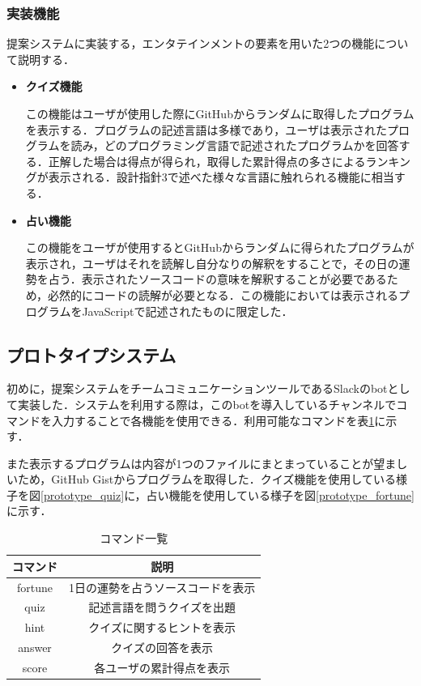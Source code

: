 \subsubsection{実装機能}
提案システムに実装する，エンタテインメントの要素を用いた2つの機能について説明する．
\begin{itemize}
  \item {\bf クイズ機能}

  この機能はユーザが使用した際にGitHubからランダムに取得したプログラムを表示する．プログラムの記述言語は多様であり，ユーザは表示されたプログラムを読み，どのプログラミング言語で記述されたプログラムかを回答する．正解した場合は得点が得られ，取得した累計得点の多さによるランキングが表示される．設計指針3で述べた様々な言語に触れられる機能に相当する．

  \item {\bf 占い機能}

  この機能をユーザが使用するとGitHubからランダムに得られたプログラムが表示され，ユーザはそれを読解し自分なりの解釈をすることで，その日の運勢を占う．表示されたソースコードの意味を解釈することが必要であるため，必然的にコードの読解が必要となる．この機能においては表示されるプログラムをJavaScriptで記述されたものに限定した．

\end{itemize}

\subsection{プロトタイプシステム}
初めに，提案システムをチームコミュニケーションツールであるSlackのbotとして実装した．システムを利用する際は，このbotを導入しているチャンネルでコマンドを入力することで各機能を使用できる．利用可能なコマンドを表\ref{function}に示す．

また表示するプログラムは内容が1つのファイルにまとまっていることが望ましいため，GitHub Gistからプログラムを取得した．クイズ機能を使用している様子を図\ref{prototype_quiz}に，占い機能を使用している様子を図\ref{prototype_fortune}に示す．

\begin{table}[!ht]
  \centering
    \caption{コマンド一覧}
      \begin{tabular}{|c|c|} \hline
        コマンド & 説明 \\ \hline \hline
        fortune & 1日の運勢を占うソースコードを表示 \\ \hline
        quiz & 記述言語を問うクイズを出題 \\ \hline
        hint & クイズに関するヒントを表示 \\ \hline
        answer & クイズの回答を表示 \\ \hline
        score & 各ユーザの累計得点を表示 \\ \hline
      \end{tabular}
    \label{function}
  \end{table}

